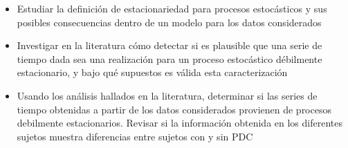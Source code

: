 %
%
%
%

\begin{itemize}
\item Estudiar la definici\'on de estacionariedad para procesos estoc\'asticos y sus posibles 
consecuencias dentro de un modelo para los datos considerados

\item Investigar en la literatura c\'omo detectar si es plausible que una serie de tiempo dada sea 
una realizaci\'on para un proceso estoc\'astico d\'ebilmente estacionario, y bajo qu\'e supuestos 
es v\'alida esta caracterizaci\'on

\item Usando los an\'alisis hallados en la literatura, determinar si las series de tiempo 
obtenidas a partir de los datos considerados provienen de procesos debilmente estacionarios.
Revisar si la informaci\'on obtenida en los diferentes sujetos muestra diferencias entre sujetos 
con y sin PDC
\end{itemize}

